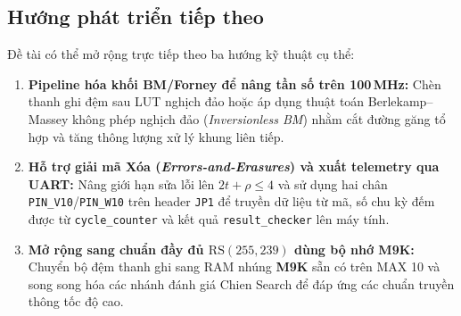 \subsection*{Hướng phát triển tiếp theo}
Đề tài có thể mở rộng trực tiếp theo ba hướng kỹ thuật cụ thể:
\begin{enumerate}
    \item \textbf{Pipeline hóa khối BM/Forney để nâng tần số trên 100\,MHz:} Chèn thanh ghi đệm sau LUT nghịch đảo hoặc áp dụng thuật toán Berlekamp--Massey không phép nghịch đảo (\textit{Inversionless BM}) nhằm cắt đường găng tổ hợp và tăng thông lượng xử lý khung liên tiếp.
    \item \textbf{Hỗ trợ giải mã Xóa (\textit{Errors-and-Erasures}) và xuất telemetry qua UART:} Nâng giới hạn sửa lỗi lên $2t + \rho \le 4$ và sử dụng hai chân \texttt{PIN\_V10}/\texttt{PIN\_W10} trên header \texttt{JP1} để truyền dữ liệu từ mã, số chu kỳ đếm được từ \texttt{cycle\_counter} và kết quả \texttt{result\_checker} lên máy tính.
    \item \textbf{Mở rộng sang chuẩn đầy đủ $\mathrm{RS}(255,239)$ dùng bộ nhớ M9K:} Chuyển bộ đệm thanh ghi sang RAM nhúng \textbf{M9K} sẵn có trên MAX 10 và song song hóa các nhánh đánh giá Chien Search để đáp ứng các chuẩn truyền thông tốc độ cao.
\end{enumerate}

